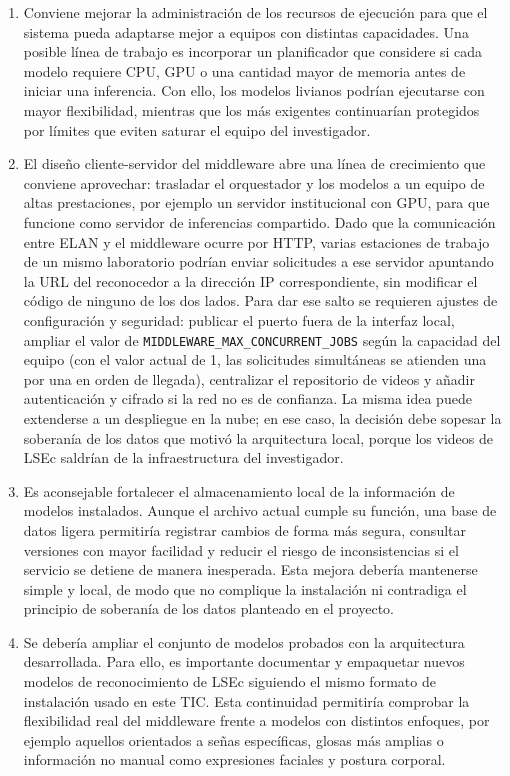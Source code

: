 \begin{enumerate}
    \item Conviene mejorar la administración de los recursos de ejecución para que el sistema pueda adaptarse mejor a equipos con distintas capacidades. Una posible línea de trabajo es incorporar un planificador que considere si cada modelo requiere CPU, GPU o una cantidad mayor de memoria antes de iniciar una inferencia. Con ello, los modelos livianos podrían ejecutarse con mayor flexibilidad, mientras que los más exigentes continuarían protegidos por límites que eviten saturar el equipo del investigador.

    \item El diseño cliente-servidor del middleware abre una línea de crecimiento que conviene aprovechar: trasladar el orquestador y los modelos a un equipo de altas prestaciones, por ejemplo un servidor institucional con GPU, para que funcione como servidor de inferencias compartido. Dado que la comunicación entre ELAN y el middleware ocurre por HTTP, varias estaciones de trabajo de un mismo laboratorio podrían enviar solicitudes a ese servidor apuntando la URL del reconocedor a la dirección IP correspondiente, sin modificar el código de ninguno de los dos lados. Para dar ese salto se requieren ajustes de configuración y seguridad: publicar el puerto fuera de la interfaz local, ampliar el valor de \texttt{MIDDLEWARE\_MAX\_CONCURRENT\_JOBS} según la capacidad del equipo (con el valor actual de 1, las solicitudes simultáneas se atienden una por una en orden de llegada), centralizar el repositorio de videos y añadir autenticación y cifrado si la red no es de confianza. La misma idea puede extenderse a un despliegue en la nube; en ese caso, la decisión debe sopesar la soberanía de los datos que motivó la arquitectura local, porque los videos de LSEc saldrían de la infraestructura del investigador.

    \item Es aconsejable fortalecer el almacenamiento local de la información de modelos instalados. Aunque el archivo actual cumple su función, una base de datos ligera permitiría registrar cambios de forma más segura, consultar versiones con mayor facilidad y reducir el riesgo de inconsistencias si el servicio se detiene de manera inesperada. Esta mejora debería mantenerse simple y local, de modo que no complique la instalación ni contradiga el principio de soberanía de los datos planteado en el proyecto.

    \item Se debería ampliar el conjunto de modelos probados con la arquitectura desarrollada. Para ello, es importante documentar y empaquetar nuevos modelos de reconocimiento de LSEc siguiendo el mismo formato de instalación usado en este TIC. Esta continuidad permitiría comprobar la flexibilidad real del middleware frente a modelos con distintos enfoques, por ejemplo aquellos orientados a señas específicas, glosas más amplias o información no manual como expresiones faciales y postura corporal.


\end{enumerate}
